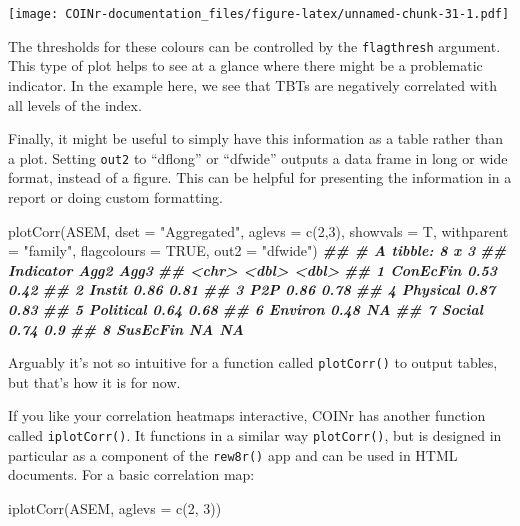 \documentclass[
]{book}
\newenvironment{Shaded}{\begin{snugshade}}{\end{snugshade}}
\newcommand{\AttributeTok}[1]{\textcolor[rgb]{0.77,0.63,0.00}{#1}}
\newcommand{\ConstantTok}[1]{\textcolor[rgb]{0.00,0.00,0.00}{#1}}
\newcommand{\DecValTok}[1]{\textcolor[rgb]{0.00,0.00,0.81}{#1}}
\newcommand{\DocumentationTok}[1]{\textcolor[rgb]{0.56,0.35,0.01}{\textbf{\textit{#1}}}}
\newcommand{\FunctionTok}[1]{\textcolor[rgb]{0.00,0.00,0.00}{#1}}
\newcommand{\NormalTok}[1]{#1}
\newcommand{\StringTok}[1]{\textcolor[rgb]{0.31,0.60,0.02}{#1}}
\begin{document}
\texttt{[image: COINr-documentation\_files/figure-latex/unnamed-chunk-31-1.pdf]}

The thresholds for these colours can be controlled by the \texttt{flagthresh} argument. This type of plot helps to see at a glance where there might be a problematic indicator. In the example here, we see that TBTs are negatively correlated with all levels of the index.

Finally, it might be useful to simply have this information as a table rather than a plot. Setting \texttt{out2} to ``dflong'' or ``dfwide'' outputs a data frame in long or wide format, instead of a figure. This can be helpful for presenting the information in a report or doing custom formatting.

\begin{Shaded}
\begin{Highlighting}[]
\FunctionTok{plotCorr}\NormalTok{(ASEM, }\AttributeTok{dset =} \StringTok{"Aggregated"}\NormalTok{, }\AttributeTok{aglevs =} \FunctionTok{c}\NormalTok{(}\DecValTok{2}\NormalTok{,}\DecValTok{3}\NormalTok{), }\AttributeTok{showvals =}\NormalTok{ T, }\AttributeTok{withparent =} \StringTok{"family"}\NormalTok{,}
         \AttributeTok{flagcolours =} \ConstantTok{TRUE}\NormalTok{, }\AttributeTok{out2 =} \StringTok{"dfwide"}\NormalTok{)}
\DocumentationTok{\#\# \# A tibble: 8 x 3}
\DocumentationTok{\#\#   Indicator  Agg2  Agg3}
\DocumentationTok{\#\#   \textless{}chr\textgreater{}     \textless{}dbl\textgreater{} \textless{}dbl\textgreater{}}
\DocumentationTok{\#\# 1 ConEcFin   0.53  0.42}
\DocumentationTok{\#\# 2 Instit     0.86  0.81}
\DocumentationTok{\#\# 3 P2P        0.86  0.78}
\DocumentationTok{\#\# 4 Physical   0.87  0.83}
\DocumentationTok{\#\# 5 Political  0.64  0.68}
\DocumentationTok{\#\# 6 Environ    0.48 NA   }
\DocumentationTok{\#\# 7 Social     0.74  0.9 }
\DocumentationTok{\#\# 8 SusEcFin  NA    NA}
\end{Highlighting}
\end{Shaded}

Arguably it's not so intuitive for a function called \texttt{plotCorr()} to output tables, but that's how it is for now.

If you like your correlation heatmaps interactive, COINr has another function called \texttt{iplotCorr()}. It functions in a similar way \texttt{plotCorr()}, but is designed in particular as a component of the \texttt{rew8r()} app and can be used in HTML documents. For a basic correlation map:

\begin{Shaded}
\begin{Highlighting}[]
\FunctionTok{iplotCorr}\NormalTok{(ASEM, }\AttributeTok{aglevs =} \FunctionTok{c}\NormalTok{(}\DecValTok{2}\NormalTok{, }\DecValTok{3}\NormalTok{))}
\end{Highlighting}
\end{Shaded}
\end{document}

